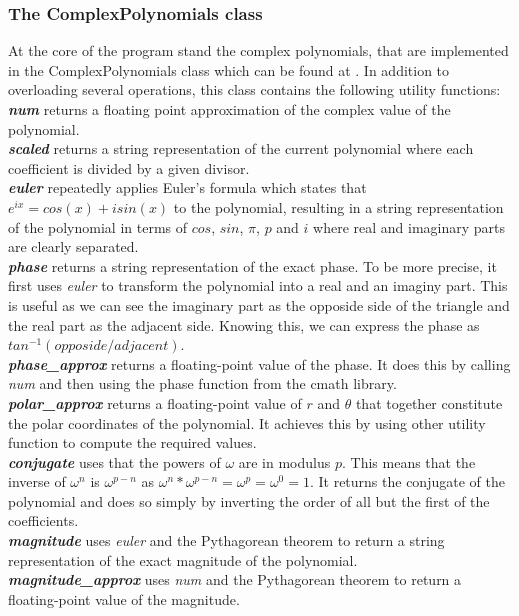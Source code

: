 \documentclass{report}
\begin{document}
\subsubsection{The ComplexPolynomials class}
At the core of the program stand the complex polynomials, that are implemented in the ComplexPolynomials class which can be found at . In addition to overloading several operations, this class contains the following utility functions:\\
\noindent\textbf{\textit{num}} returns a floating point approximation of the complex value of the polynomial.\\
\noindent\textbf{\textit{scaled}} returns a string representation of the current polynomial where each coefficient is divided by a given divisor.\\
\noindent\textbf{\textit{euler}} repeatedly applies Euler's formula which states that $e^{ix} = cos(x) + isin(x)$ to the polynomial, resulting in a string representation of the polynomial in terms of $cos$, $sin$, $\pi$, $p$ and $i$ where real and imaginary parts are clearly separated.\\
\noindent\textbf{\textit{phase}} returns a string representation of the exact phase. To be more precise, it first uses \textit{euler} to transform the polynomial into a real and an imaginy part. This is useful as we can see the imaginary part as the opposide side of the triangle and the real part as the adjacent side. Knowing this, we can express the phase as $tan^{-1}(opposide/adjacent)$.\\
\noindent\textbf{\textit{phase\_approx}} returns a floating-point value of the phase. It does this by calling \textit{num} and then using the phase function from the cmath library.\\
\noindent\textbf{\textit{polar\_approx}} returns a floating-point value of $r$ and $\theta$ that together constitute the polar coordinates of the polynomial. It achieves this by using other utility function to compute the required values.\\
\noindent\textbf{\textit{conjugate}} uses that the powers of $\omega$ are in modulus $p$.
This means that the inverse of $\omega^n$ is $\omega^{p-n}$ as $\omega^n * \omega^{p-n} = \omega^p = \omega^0 = 1$.
It returns the conjugate of the polynomial and does so simply by inverting the order of all but the first of the coefficients.\\
\noindent\textbf{\textit{magnitude}} uses \textit{euler} and the Pythagorean theorem to return a string representation of the exact magnitude of the polynomial.\\
\noindent\textbf{\textit{magnitude\_approx}} uses \textit{num} and the Pythagorean theorem to return a floating-point value of the magnitude.
\end{document}
